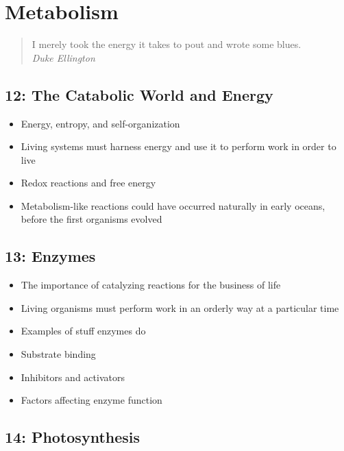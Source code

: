 \documentclass[
]{report}
\providecommand{\tightlist}{%
  \setlength{\itemsep}{0pt}\setlength{\parskip}{0pt}}
\providecommand{\tightlist}{%
  \setlength{\itemsep}{0pt}\setlength{\parskip}{0pt}}
\begin{document}
\hypertarget{metabolism}{%
\chapter{Metabolism}\label{metabolism}}

\begin{quote}
I merely took the energy it takes to pout and wrote some blues.\\
\emph{Duke Ellington}
\end{quote}

\hypertarget{the-catabolic-world-and-energy}{%
\section*{12: The Catabolic World and Energy}\label{the-catabolic-world-and-energy}}

\begin{itemize}
\tightlist
\item
  Energy, entropy, and self-organization
\item
  Living systems must harness energy and use it to perform work in order to live
\item
  Redox reactions and free energy
\item
  Metabolism-like reactions could have occurred naturally in early oceans, before the first organisms evolved
\end{itemize}

\hypertarget{enzymes}{%
\section*{13: Enzymes}\label{enzymes}}

\begin{itemize}
\tightlist
\item
  The importance of catalyzing reactions for the business of life
\item
  Living organisms must perform work in an orderly way at a particular time
\item
  Examples of stuff enzymes do
\item
  Substrate binding
\item
  Inhibitors and activators
\item
  Factors affecting enzyme function
\end{itemize}

\hypertarget{photosynthesis}{%
\section*{14: Photosynthesis}\label{photosynthesis}}
\end{document}

